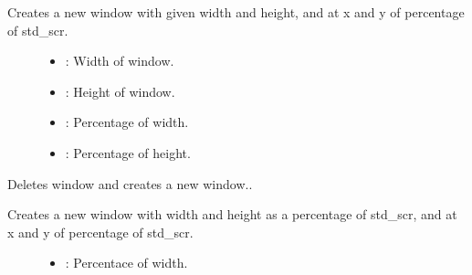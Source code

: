 \documentclass[letterpaper,10pt,english]{sphinxmanual}
\begin{document}
\begin{fulllineitems}
\begin{fulllineitems}
Creates a new window with given width and height, and at x and y of percentage of std\_scr. \begin{description}
\item[{}] \leavevmode
{\hyperref[\detokenize{index:Pessumnamespaceostendo_1a4c5850c8a109e159e874ecce8a5dc62a}]{}} 

\item[{}] \leavevmode\begin{itemize}
\item {} 
: Width of window. 

\item {} 
: Height of window. 

\item {} 
: Percentage of width. 

\item {} 
: Percentage of height. 

\end{itemize}

\end{description}


\end{fulllineitems}


\begin{fulllineitems}
\label{\detokenize{index:_CPPv2N7ostendo6Window9NewWindowEdddd}}%
\pysigstartmultiline
{}\label{\detokenize{index:Pessumclassostendo_1_1Window_1a3cc8c66d73a4bf082332a38d1b6850bb}}%
\pysigstopmultiline
Deletes window and creates a new window.. 

Creates a new window with width and height as a percentage of std\_scr, and at x and y of percentage of std\_scr. \begin{description}
\item[{}] \leavevmode
{\hyperref[\detokenize{index:Pessumnamespaceostendo_1a4c5850c8a109e159e874ecce8a5dc62a}]{}} 

\item[{}] \leavevmode\begin{itemize}
\item {} 
: Percentace of width. 


\end{itemize}
\end{description}
\end{fulllineitems}
\end{fulllineitems}
\end{document}
